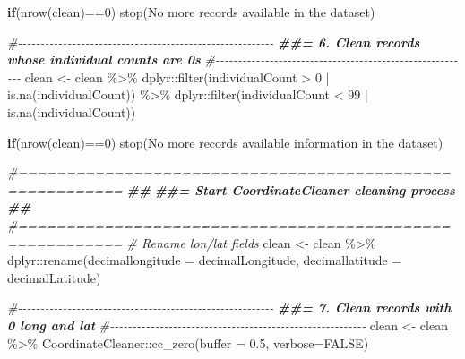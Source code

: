 \documentclass[
]{article}
\newenvironment{Shaded}{\begin{snugshade}}{\end{snugshade}}
\newcommand{\AttributeTok}[1]{\textcolor[rgb]{0.77,0.63,0.00}{#1}}
\newcommand{\CommentTok}[1]{\textcolor[rgb]{0.56,0.35,0.01}{\textit{#1}}}
\newcommand{\ConstantTok}[1]{\textcolor[rgb]{0.00,0.00,0.00}{#1}}
\newcommand{\ControlFlowTok}[1]{\textcolor[rgb]{0.13,0.29,0.53}{\textbf{#1}}}
\newcommand{\DecValTok}[1]{\textcolor[rgb]{0.00,0.00,0.81}{#1}}
\newcommand{\DocumentationTok}[1]{\textcolor[rgb]{0.56,0.35,0.01}{\textbf{\textit{#1}}}}
\newcommand{\FloatTok}[1]{\textcolor[rgb]{0.00,0.00,0.81}{#1}}
\newcommand{\FunctionTok}[1]{\textcolor[rgb]{0.00,0.00,0.00}{#1}}
\newcommand{\NormalTok}[1]{#1}
\newcommand{\OtherTok}[1]{\textcolor[rgb]{0.56,0.35,0.01}{#1}}
\newcommand{\SpecialCharTok}[1]{\textcolor[rgb]{0.00,0.00,0.00}{#1}}
\newcommand{\StringTok}[1]{\textcolor[rgb]{0.31,0.60,0.02}{#1}}
\begin{document}
\begin{Shaded}
\begin{Highlighting}[]
\ControlFlowTok{if}\NormalTok{(}\FunctionTok{nrow}\NormalTok{(clean)}\SpecialCharTok{==}\DecValTok{0}\NormalTok{) }\FunctionTok{stop}\NormalTok{(}\StringTok{\textquotesingle{}No more records available in the dataset\textquotesingle{}}\NormalTok{)}

\CommentTok{\#{-}{-}{-}{-}{-}{-}{-}{-}{-}{-}{-}{-}{-}{-}{-}{-}{-}{-}{-}{-}{-}{-}{-}{-}{-}{-}{-}{-}{-}{-}{-}{-}{-}{-}{-}{-}{-}{-}{-}{-}{-}{-}{-}{-}{-}{-}{-}{-}{-}{-}{-}{-}{-}{-}{-}{-}{-}}
\DocumentationTok{\#\#= 6. Clean records whose individual counts are 0s}
\CommentTok{\#{-}{-}{-}{-}{-}{-}{-}{-}{-}{-}{-}{-}{-}{-}{-}{-}{-}{-}{-}{-}{-}{-}{-}{-}{-}{-}{-}{-}{-}{-}{-}{-}{-}{-}{-}{-}{-}{-}{-}{-}{-}{-}{-}{-}{-}{-}{-}{-}{-}{-}{-}{-}{-}{-}{-}{-}{-}}
\NormalTok{clean }\OtherTok{\textless{}{-}}\NormalTok{ clean }\SpecialCharTok{\%\textgreater{}\%}
\NormalTok{  dplyr}\SpecialCharTok{::}\FunctionTok{filter}\NormalTok{(individualCount }\SpecialCharTok{\textgreater{}} \DecValTok{0} \SpecialCharTok{|} \FunctionTok{is.na}\NormalTok{(individualCount)) }\SpecialCharTok{\%\textgreater{}\%}
\NormalTok{  dplyr}\SpecialCharTok{::}\FunctionTok{filter}\NormalTok{(individualCount }\SpecialCharTok{\textless{}} \DecValTok{99} \SpecialCharTok{|} \FunctionTok{is.na}\NormalTok{(individualCount))}

\ControlFlowTok{if}\NormalTok{(}\FunctionTok{nrow}\NormalTok{(clean)}\SpecialCharTok{==}\DecValTok{0}\NormalTok{) }\FunctionTok{stop}\NormalTok{(}\StringTok{\textquotesingle{}No more records available information in the dataset\textquotesingle{}}\NormalTok{)}

\CommentTok{\#=========================================================}
\DocumentationTok{\#\#}
\DocumentationTok{\#\#=  Start CoordinateCleaner cleaning process}
\DocumentationTok{\#\#}
\CommentTok{\#=========================================================}
\CommentTok{\# Rename lon/lat fields}
\NormalTok{clean }\OtherTok{\textless{}{-}}\NormalTok{ clean }\SpecialCharTok{\%\textgreater{}\%}
\NormalTok{  dplyr}\SpecialCharTok{::}\FunctionTok{rename}\NormalTok{(}\AttributeTok{decimallongitude =} \StringTok{\textquotesingle{}decimalLongitude\textquotesingle{}}\NormalTok{, }\AttributeTok{decimallatitude =} \StringTok{\textquotesingle{}decimalLatitude\textquotesingle{}}\NormalTok{)}

\CommentTok{\#{-}{-}{-}{-}{-}{-}{-}{-}{-}{-}{-}{-}{-}{-}{-}{-}{-}{-}{-}{-}{-}{-}{-}{-}{-}{-}{-}{-}{-}{-}{-}{-}{-}{-}{-}{-}{-}{-}{-}{-}{-}{-}{-}{-}{-}{-}{-}{-}{-}{-}{-}{-}{-}{-}{-}{-}{-}}
\DocumentationTok{\#\#= 7. Clean records with 0 long and lat}
\CommentTok{\#{-}{-}{-}{-}{-}{-}{-}{-}{-}{-}{-}{-}{-}{-}{-}{-}{-}{-}{-}{-}{-}{-}{-}{-}{-}{-}{-}{-}{-}{-}{-}{-}{-}{-}{-}{-}{-}{-}{-}{-}{-}{-}{-}{-}{-}{-}{-}{-}{-}{-}{-}{-}{-}{-}{-}{-}{-}}
\NormalTok{clean }\OtherTok{\textless{}{-}}\NormalTok{ clean }\SpecialCharTok{\%\textgreater{}\%}
\NormalTok{  CoordinateCleaner}\SpecialCharTok{::}\FunctionTok{cc\_zero}\NormalTok{(}\AttributeTok{buffer =} \FloatTok{0.5}\NormalTok{, }\AttributeTok{verbose=}\ConstantTok{FALSE}\NormalTok{)}


\end{Highlighting}
\end{Shaded}
\end{document}
